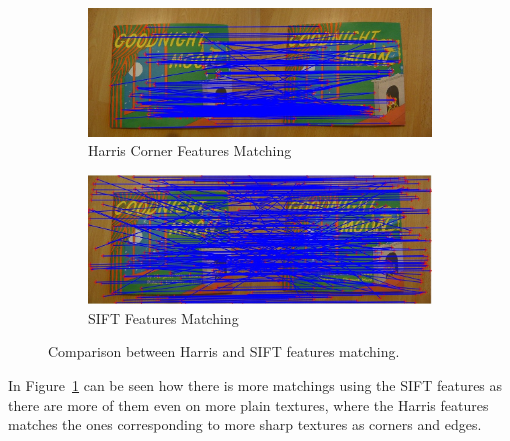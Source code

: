 \documentclass{ethz_report}
\begin{document}
\begin{figure}[H]
\centering
\begin{subfigure}[b]{\textwidth}
  \centering
  \includegraphics[width=1\linewidth]{images/matching_harris}
  \caption{Harris Corner Features Matching}
\end{subfigure}
\begin{subfigure}[b]{\textwidth}
  \centering
  \includegraphics[width=1\linewidth]{images/matching_sift}
  \caption{SIFT Features Matching}
\end{subfigure}
\caption{Comparison between Harris and SIFT features matching.}
\label{img:comparison_features_matching}
\end{figure}

In Figure~\ref{img:comparison_features_matching} can be seen how there is more matchings using the
SIFT features as there are more of them even on more plain textures, where the Harris features
matches the ones corresponding to more sharp textures as corners and edges.
\end{document}
